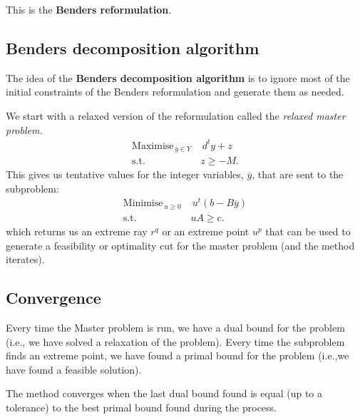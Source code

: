 This is the \textbf{Benders reformulation}. 


\newpage

\subsection*{Benders decomposition algorithm}

The idea of the \textbf{Benders decomposition algorithm} is to ignore most of the initial constraints of the Benders reformulation and generate them as needed. 

We start with a relaxed version of the reformulation called the \emph{relaxed master problem.}
\begin{align*}
\textrm{Maximise}_{\, \overline{y} \in Y \,}  & \,  d^ty + z \\
\textrm{s.t.} \quad & z \geq -M.
\end{align*}
\vspace{-.2cm}
This gives us tentative values for the integer variables, $\overline{y}$, that are sent to the subproblem:
\begin{align*}
\textrm{Minimise}_{\, u \geq 0 \,}  & \,  u^t(b-B\overline{y}) \\
\textrm{s.t.} \quad & uA \geq c.
\end{align*}
which returns us an extreme ray $r^q$ or an extreme point $u^p$ that can be used to generate a feasibility or optimality cut for the master problem (and the method iterates). 

\vfill

\subsection*{Convergence}

Every time the Master problem is run, we have a dual bound for the problem (i.e., we have solved a relaxation of the problem). Every time the subproblem finds an extreme point, we have found a primal bound for the problem (i.e.,we have found a feasible solution). 

The method converges when the last dual bound found is equal (up to a tolerance) to the best primal bound found during the process. 

